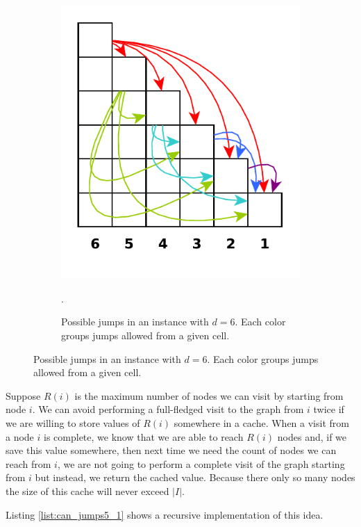 \begin{figure}[t]
\begin{subfigure}[]{0.45\textwidth}
        \includegraphics[width=\textwidth]{sources/can_jump/images/example_quadratic_edges}
        \caption[]{Possible jumps in an instance with $d=6$. Each color groups jumps allowed from a given cell.}.
        \label{fig:can_jump5:many_edges}
    \end{subfigure}
\end{figure}


Suppose $R(i)$ is the maximum number of nodes we can visit by starting from node $i$. We can avoid performing a full-fledged visit to the graph from $i$ twice if we are willing to store values of $R(i)$ somewhere in a cache.
When a visit from a node $i$ is complete, we know that we are able to reach $R(i)$ nodes and, if we save this value somewhere, then next time we need the count of nodes we can reach from $i$, we are not going to perform a complete visit of the graph starting from $i$ but instead, we return the cached value.
Because there only so many nodes the size of this cache will never exceed $|I|$. 

Listing \ref{list:can_jumps5_1} shows a recursive implementation of this idea.




